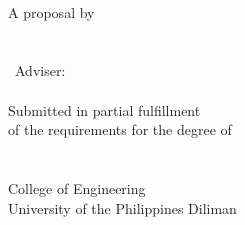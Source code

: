 \center
\vspace*{2.54cm}

\Title\\[2cm]

A \MakeLowercase{\Type} proposal by\\[2cm]

\textbf{\Student}\\
\StudentNumber\\[2cm]

\Type\ Adviser:\\
\textbf{\Adviser}\\[2cm]

Submitted in partial fulfillment\\of the requirements for the degree of\\
\Degree\\[2cm]

\Department\\
College of Engineering\\
University of the Philippines Diliman\\[2cm]

\SubmissionDate
